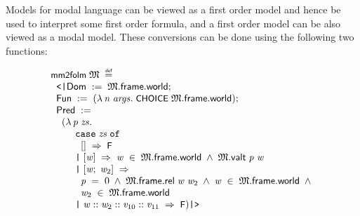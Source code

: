 \documentclass[letterpaper]{article}
\renewcommand{\HOLConst}[1]{{\textsf{\upshape\small #1}}}
\renewcommand{\HOLKeyword}[1]{\texttt{#1}}
\newenvironment{holmath}{\begin{displaymath}\begin{array}{l}}{\end{array}\end{displaymath}\ignorespacesafterend}
\begin{document}
Models for modal language can be viewed as a first order model and hence be used to interpret some first order formula, and a first order model can be also viewed as a modal model. These conversions can be done using the following two functions:

\begin{holmath}
  \HOLConst{mm2folm}\;\HOLFreeVar{\ensuremath{\mathfrak{M}}}\;\HOLSymConst{\HOLTokenDefEquality{}}\\
\;\;\HOLTokenLeftrec{}\HOLFieldName{Dom}\;:=\;\HOLFreeVar{\ensuremath{\mathfrak{M}}}.\HOLFieldName{frame}.\HOLFieldName{world};\\
\;\;\HOLFieldName{Fun}\;:=\;(\HOLTokenLambda{}\HOLBoundVar{n}\;\HOLBoundVar{args}.\;\HOLConst{CHOICE}\;\HOLFreeVar{\ensuremath{\mathfrak{M}}}.\HOLFieldName{frame}.\HOLFieldName{world});\\
\;\;\HOLFieldName{Pred}\;:=\\
\;\;\;\;(\HOLTokenLambda{}\HOLBoundVar{p}\;\HOLBoundVar{zs}.\\
\;\;\;\;\;\;\;\;\;\HOLKeyword{case}\;\HOLBoundVar{zs}\;\HOLKeyword{of}\\
\;\;\;\;\;\;\;\;\;\;\;[]\;\HOLTokenImp{}\;\HOLConst{F}\\
\;\;\;\;\;\;\;\;\;\HOLTokenBar{}\;[\HOLBoundVar{w}]\;\HOLTokenImp{}\;\HOLBoundVar{w}\;\HOLSymConst{\HOLTokenIn{}}\;\HOLFreeVar{\ensuremath{\mathfrak{M}}}.\HOLFieldName{frame}.\HOLFieldName{world}\;\HOLSymConst{\HOLTokenConj{}}\;\HOLFreeVar{\ensuremath{\mathfrak{M}}}.\HOLFieldName{valt}\;\HOLBoundVar{p}\;\HOLBoundVar{w}\\
\;\;\;\;\;\;\;\;\;\HOLTokenBar{}\;[\HOLBoundVar{w};\;\HOLBoundVar{w\sb{\mathrm{2}}}]\;\HOLTokenImp{}\\
\;\;\;\;\;\;\;\;\;\;\;\HOLBoundVar{p}\;\HOLSymConst{=}\;\HOLNumLit{0}\;\HOLSymConst{\HOLTokenConj{}}\;\HOLFreeVar{\ensuremath{\mathfrak{M}}}.\HOLFieldName{frame}.\HOLFieldName{rel}\;\HOLBoundVar{w}\;\HOLBoundVar{w\sb{\mathrm{2}}}\;\HOLSymConst{\HOLTokenConj{}}\;\HOLBoundVar{w}\;\HOLSymConst{\HOLTokenIn{}}\;\HOLFreeVar{\ensuremath{\mathfrak{M}}}.\HOLFieldName{frame}.\HOLFieldName{world}\;\HOLSymConst{\HOLTokenConj{}}\\
\;\;\;\;\;\;\;\;\;\;\;\HOLBoundVar{w\sb{\mathrm{2}}}\;\HOLSymConst{\HOLTokenIn{}}\;\HOLFreeVar{\ensuremath{\mathfrak{M}}}.\HOLFieldName{frame}.\HOLFieldName{world}\\
\;\;\;\;\;\;\;\;\;\HOLTokenBar{}\;\HOLBoundVar{w}\HOLSymConst{::}\HOLBoundVar{w\sb{\mathrm{2}}}\HOLSymConst{::}\HOLBoundVar{v\sb{\mathrm{10}}}\HOLSymConst{::}\HOLBoundVar{v\sb{\mathrm{11}}}\;\HOLTokenImp{}\;\HOLConst{F})\HOLTokenRightrec{}

\end{holmath}
\end{document}
